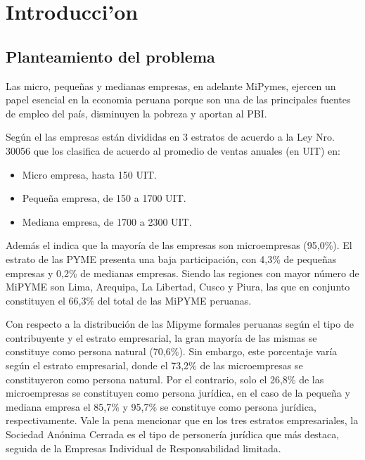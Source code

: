 
\chapter{Introducci'on}

\section{Planteamiento del problema}
Las micro, peque\~nas y medianas empresas, en adelante MiPymes, ejercen un papel
esencial en la economia peruana porque son una de las principales fuentes de empleo
del pa\'is, disminuyen la pobreza y aportan al PBI.

Seg\'un el \cite{produce2} las empresas est\'an divididas en 3 estratos de acuerdo
a la Ley Nro. 30056 que los clasifica de acuerdo al promedio de ventas anuales
(en UIT) en:
\begin{itemize}
    \item Micro empresa, hasta 150 UIT.
    \item Peque\~na empresa, de 150 a 1700 UIT.
    \item Mediana empresa, de 1700 a 2300 UIT.
\end{itemize}

Adem\'as el \cite{produce} indica que la mayor\'ia de las empresas son
microempresas (95,0\%). El estrato de las PYME presenta una baja participaci\'on,
con 4,3\% de peque\~nas empresas y 0,2\% de medianas empresas. Siendo las regiones
con mayor n\'umero de MiPYME son Lima, Arequipa, La Libertad, Cusco y Piura, las que
en conjunto constituyen el 66,3\% del total de las MiPYME peruanas.

\cite{produce2} Con respecto a la distribuci\'on de las Mipyme formales peruanas seg\'un el tipo de
contribuyente y el estrato empresarial, la gran mayor\'ia de las mismas se constituye
como persona natural (70,6\%). Sin embargo, este porcentaje var\'ia seg\'un el estrato
empresarial, donde el 73,2\% de las microempresas se constituyeron como persona
natural. Por el contrario, solo el 26,8\% de las microempresas se constituyen
como persona jur\'idica, en el caso de la peque\~na y mediana empresa el 85,7\% y
95,7\% se constituye como persona jur\'idica, respectivamente. Vale la pena mencionar
que en los tres estratos empresariales, la Sociedad An\'onima Cerrada es el tipo
de personer\'ia jur\'idica que m\'as destaca, seguida de la Empresas Individual de
Responsabilidad limitada.

